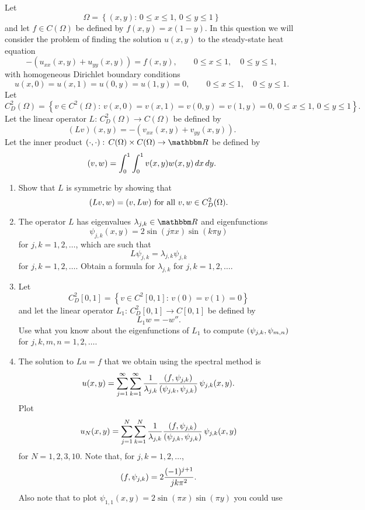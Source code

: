 Let
\[
\Omega=\left\{(x,y):\,0\le x\le 1,\,0\le y\le 1\right\}
\]
and let $f\in  C(\Omega)$ be defined by $f(x,y) = x(1-y)$. In this question we will consider the problem of finding the solution $u(x,y)$ to the steady-state heat equation
\[ 
-(u_{xx}(x,y) +u_{yy}(x,y)) = f(x,y), \qquad 0\le x \le 1, \quad 0\le y\le 1,
\]
with homogeneous Dirichlet boundary conditions
\[
u(x,0)=u(x,1)=u(0,y)=u(1,y)=0, \qquad 0\le x \le 1, \quad 0\le y\le 1.
\]
Let
\[
C^2_D(\Omega)=\left\{v\in C^2(\Omega):\,v(x,0)=v(x,1)=v(0,y)=v(1,y)=0,\,0\le x\le 1,\,0\le y\le 1\right\}.
\]
Let the linear operator $L:\,C^2_D(\Omega)\rightarrow C(\Omega)$ be defined by
\[
\left(L v\right)(x,y) = -\left(v_{xx}(x,y) + v_{yy}(x,y)\right).
\]
Let the inner product $\ip{\cdot,\cdot}:\,C(\Omega)\times C(\Omega)\rightarrow \R$ be defined by
\[
(v,w) =\int_0^1 \int_0^1 v(x,y) w(x,y) \, dx\,dy.
\]

\begin{enumerate}
\item Show that $L$ is symmetric by showing that
\[
(Lv,w)=(v,Lw)\mbox{ for all }v,w\in C^2_D(\Omega).
\]

\item The operator $L$ has eigenvalues $\lambda_{j,k}\in\R$ and eigenfunctions
\[
\psi_{j,k}(x,y) = 2 \sin(j \pi x) \sin(k \pi y)
\]
for $j,k = 1,2,\ldots$, which are such that
\[
L\psi_{j,k}=\lambda_{j,k}\psi_{j,k}
\]
for $j,k = 1,2,\ldots$. Obtain a formula for $\lambda_{j,k}$ for $j,k = 1,2,\ldots$.

\item Let
\[
C^2_D[0,1]=\left\{v\in C^2[0,1]:\,v(0)=v(1)=0\right\}
\]
and let the linear operator $L_1:\,C^2_D[0,1]\rightarrow C[0,1]$ be defined by
\[
L_1w = -w''.
\]
Use what you know about the eigenfunctions of $L_1$ to compute $(\psi_{j,k},\psi_{m,n})$ for $j,k,m,n = 1,2,\ldots$.

\item The solution to $Lu=f$ that we obtain using the spectral method is
\[
u(x,y) = \sum_{j=1}^\infty \sum_{k=1}^\infty{1\over \lambda_{j,k}} {(f,\psi_{j,k}) \over (\psi_{j,k},\psi_{j,k})}\, \psi_{j,k}(x,y).
\]
Plot
\[
u_N(x,y)= \sum_{j=1}^N \sum_{k=1}^N{1\over \lambda_{j,k}} {(f,\psi_{j,k}) \over (\psi_{j,k},\psi_{j,k})}\, \psi_{j,k}(x,y)
\]
for $N=1,2,3,10$. Note that, for $j,k = 1,2,\ldots$,
\[
(f, \psi_{j,k})=2{(-1)^{j+1} \over jk\pi^2}.
\]
Also note that to plot $\psi_{1,1}(x,y) = 2 \sin(\pi x)\sin(\pi y)$ you could use


\end{enumerate}




